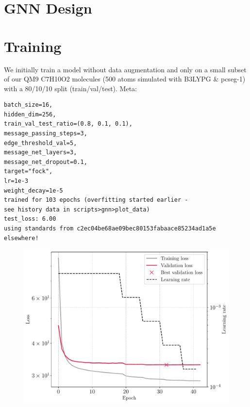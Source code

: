 \section{GNN Design}
\label{sec:gnn_design}

\section{Training}
\label{sec:gnn_training}
We initially train a model without data augmentation and only on a small subset of our QM9 C7H10O2 molecules (500 atoms simulated with B3LYPG \& pcseg-1) with a 80/10/10 split (train/val/test). 
Meta: 
\begin{verbatim}
batch_size=16,
hidden_dim=256,
train_val_test_ratio=(0.8, 0.1, 0.1),
message_passing_steps=3,
edge_threshold_val=5,
message_net_layers=3,
message_net_dropout=0.1,
target="fock",
lr=1e-3 
weight_decay=1e-5
trained for 103 epochs (overfitting started earlier - 
see history data in scripts>gnn>plot_data)
test_loss: 6.00
using standards from c2ec04be68ae09bec80153fabaace85234ad1a5e elsewhere!
\end{verbatim}
        
\begin{figure}[H]
    \centering
    \includegraphics[width=\textwidth]{../fig/gnn/mgnn_pcseg1_simple_loss.pdf}
    \caption[GNN initial training Loss]{}
    \label{fig:gnn_initial_training_loss}
\end{figure}
